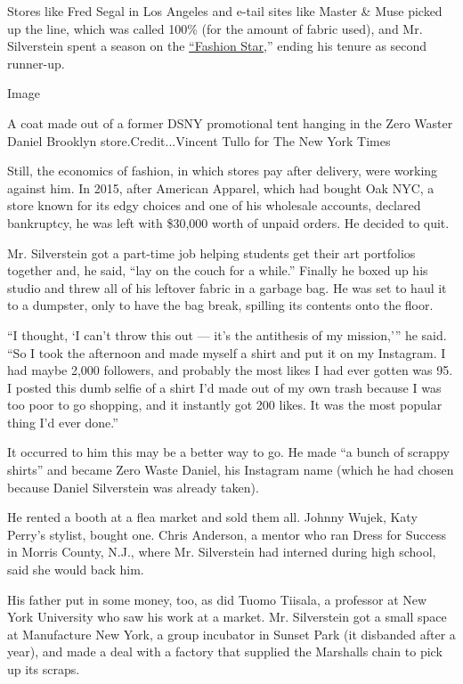 Stores like Fred Segal in Los Angeles and e-tail sites like Master \&
Muse picked up the line, which was called 100\% (for the amount of
fabric used), and Mr. Silverstein spent a season on the
\href{https://www.nytimes3xbfgragh.onion/2012/03/13/arts/television/fashion-star-designer-competition-series-on-nbc.html}{``Fashion
Star},'' ending his tenure as second runner-up.

Image

A coat made out of a former DSNY promotional tent hanging in the Zero
Waster Daniel Brooklyn store.Credit...Vincent Tullo for The New York
Times

Still, the economics of fashion, in which stores pay after delivery,
were working against him. In 2015, after American Apparel, which had
bought Oak NYC, a store known for its edgy choices and one of his
wholesale accounts, declared bankruptcy, he was left with \$30,000 worth
of unpaid orders. He decided to quit.

Mr. Silverstein got a part-time job helping students get their art
portfolios together and, he said, ``lay on the couch for a while.''
Finally he boxed up his studio and threw all of his leftover fabric in a
garbage bag. He was set to haul it to a dumpster, only to have the bag
break, spilling its contents onto the floor.

``I thought, `I can't throw this out --- it's the antithesis of my
mission,''' he said. ``So I took the afternoon and made myself a shirt
and put it on my Instagram. I had maybe 2,000 followers, and probably
the most likes I had ever gotten was 95. I posted this dumb selfie of a
shirt I'd made out of my own trash because I was too poor to go
shopping, and it instantly got 200 likes. It was the most popular thing
I'd ever done.''

It occurred to him this may be a better way to go. He made ``a bunch of
scrappy shirts'' and became Zero Waste Daniel, his Instagram name (which
he had chosen because Daniel Silverstein was already taken).

He rented a booth at a flea market and sold them all. Johnny Wujek, Katy
Perry's stylist, bought one. Chris Anderson, a mentor who ran Dress for
Success in Morris County, N.J., where Mr. Silverstein had interned
during high school, said she would back him.

His father put in some money, too, as did Tuomo Tiisala, a professor at
New York University who saw his work at a market. Mr. Silverstein got a
small space at Manufacture New York, a group incubator in Sunset Park
(it disbanded after a year), and made a deal with a factory that
supplied the Marshalls chain to pick up its scraps.

